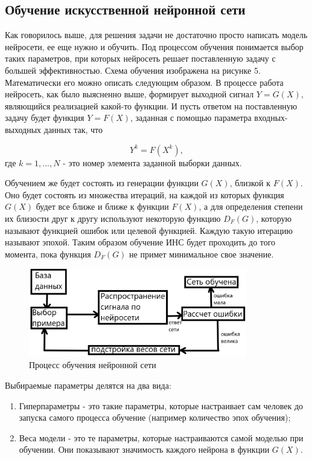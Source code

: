 \documentclass[bachelor, och, coursework]{shiza}
\begin{document}
\subsection{Обучение искусственной нейронной сети}

Как говорилось выше, для решения задачи не достаточно просто написать модель нейросети, ее еще нужно и обучить. Под процессом обучения понимается выбор
таких параметров, при которых нейросеть решает поставленную задачу с большей эффективностью. Схема обучения изображена на рисунке 5. Математически его 
можно описать следующим образом. В процессе работа нейросеть, как было выясненно выше, формирует выходной сигнал $Y = G(X)$, являющийся реализацией какой-то
функции. И пусть ответом на поставленную задачу будет функция $Y = F(X)$, заданная с помощью параметра входных-выходных данных так, что

\begin{equation}
    Y^k = F(X^k),
\end{equation}
где $k = 1, ..., N$ - это номер элемента заданной выборки данных.

Обучением же будет состоять из генерации функции $G(X)$, близкой к $F(X)$. Оно будет состоять из множества итераций, на каждой из которых функция $G(X)$ будет
все ближе и ближе к функции $F(X)$, а для определения степени их близости друг к другу используют некоторую функцию $D_F(G)$, которую называют функцией ошибок или
целевой функцией. Каждую такую итерацию называют эпохой. Таким образом обучение ИНС будет проходить до того момента, пока функция $D_F(G)$ не примет минимальное свое значение.

\begin{figure}[H]
    \centering
    \includegraphics[width=0.85\textwidth]{pic/5}
    \caption{Процесс обучения нейронной сети}
    \label{fig:img1}
\end{figure}

Выбираемые параметры делятся на два вида:

\begin{enumerate}
    \item Гиперпараметры - это такие параметры, которые настраивает сам человек до запуска самого процесса обучение (например количество эпох обучения);
    \item Веса модели - это те параметры, которые настраиваются самой моделью при обучении. Они показывают значимость каждого нейрона в функции $G(X)$.
\end{enumerate}
\end{document}
